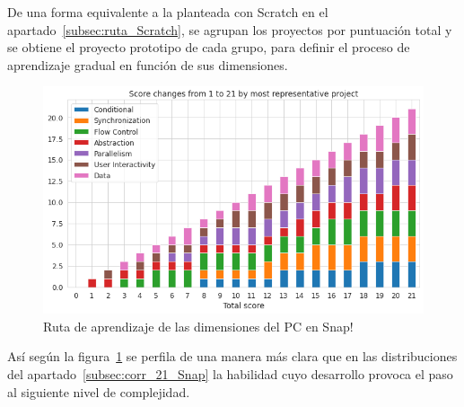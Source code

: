 \documentclass[a4paper, 12pt]{book}
\begin{document}
De una forma equivalente a la planteada con Scratch en el apartado~\ref{subsec:ruta_Scratch}, se agrupan los proyectos por puntuación total y se obtiene el proyecto prototipo de cada grupo, para definir el proceso de aprendizaje gradual en función de sus dimensiones. 

\begin{figure}[H]
    \centering
    \includegraphics[width=1.0\textwidth]{img/path_CT_Snap.png}
    \caption{Ruta de aprendizaje de las dimensiones del PC en Snap!}\label{fig:path_Snap}
\end{figure}

Así según la figura~\ref{fig:path_Snap} se perfila de una manera más clara que en las distribuciones del apartado~\ref{subsec:corr_21_Snap} la habilidad cuyo desarrollo provoca el paso al siguiente nivel de complejidad. 
\end{document}

